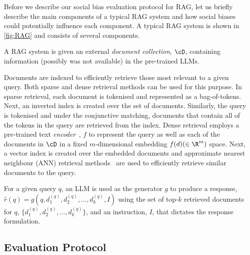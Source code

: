 \documentclass[11pt,a4paper]{article}
\begin{document}
Before we describe our social bias evaluation protocol for \ac{RAG}, let us briefly describe the main components of a typical \ac{RAG} system and how social biases could potentially influence each component.
A typical \ac{RAG} system is shown in \autoref{fig:RAG} and consists of several components.
\begin{description}[style=unboxed,leftmargin=0cm]
    \item[Document Collection $\cD$:] A \ac{RAG} system is given an external \emph{document collection},  $\cD$, containing information (possibly was not available) in the pre-trained \acp{LLM}.

    \item[Retriever:] Documents are indexed to efficiently retrieve those most relevant to a given query. 
    Both sparse and dense retrieval methods can be used for this purpose. 
    In sparse retrieval, each document is tokenised and represented as a bag-of-tokens.
    Next, an inverted index is created over the set of documents.
    Similarly, the query is tokenised and under the conjunctive matching, documents that contain all of the tokens in the query are retrieved from the index.
    Dense retrieval employs a pre-trained text \emph{encoder}~\cite{Xu:2023a,Gao:2021c}, $f$ to represent the query as well as each of the documents in $\cD$ in a fixed $m$-dimensional embedding $f(d) (\in \R^m)$ space.
    Next, a vector index is created over the embedded documents and approximate nearest neighbour (ANN) retrieval methods~\cite{Malkov:2020,Guo2020-dc} are used to efficiently retrieve similar documents to the query.

    \item[Generator $g$:] For a given query $q$, an \ac{LLM} is used as the generator $g$ to produce a response, $\hat{r}(q) = g(q, d^{(q)}_1, d^{(q)}_2, \ldots, d^{(q)}_k, I)$ using the set of top-$k$ retrieved documents for $q$, $\{d^{(q)}_1, d^{(q)}_2, \ldots, d^{(q)}_k\}$, and an instruction, $I$, that dictates the response formulation.
\end{description}


\subsection{Evaluation Protocol}
\label{sec:protocol}

\end{document}
